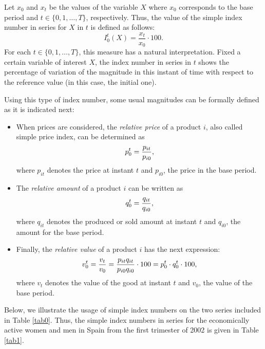 Let $x_0$ and $x_t$ be the values of the variable $X$ where $x_0$ corresponds to the base period and  $t\in \{0,1,\dots,T\}$,  respectively.  Thus, the value of the simple index number in series for $X$ in $t$ is defined as follows:
\begin{equation}\label{niinserie}
I_0^t(X)=\frac{x_t}{x_0}\cdot 100.
\end{equation}
For each  $t\in \{0,1,\dots,T\}$, this measure has a natural interpretation. Fixed a certain variable of interest $X$, the index number in series in $t$ shows the percentage of variation of the magnitude in this instant of time with respect to the reference value (in this case, the initial one). 

Using this type of index number, some usual magnitudes can be formally defined as it is indicated next: 
\begin{itemize}
	\item When  prices are considered, the \emph{relative price} of a product $i$, also called simple price index, can be determined as\vspace*{-0.05 cm} $$p_0^t=\frac{p_{it}}{p_{i0}},\vspace*{-0.05 cm}$$where $p_{it}$ denotes the price at instant $t$ and $p_{i0}$, the price in the base period. 
	\item The \emph{relative amount} of a product $i$ can be written as \vspace*{-0.05 cm} $$q_0^t=\frac{q_{it}}{q_{i0}},\vspace*{-0.05 cm}$$ where $q_{it}$ denotes the produced or sold amount at instant $t$ and $q_{i0}$, the amount for the base period. 
	\item Finally, the \emph{relative value} of a product $i$ has the next expression:\vspace*{-0.05 cm}$$v_0^t=\frac{v_t}{v_0}=\frac{p_{it}q_{it}}{p_{i0}q_{i0}}\cdot 100= p_0^t\cdot q_0^t\cdot 100,\vspace*{-0.05 cm}$$ where $v_{t}$ denotes the value of the good at instant $t$ and $v_{0}$, the value of the base period. 
\end{itemize}




Below, we illustrate the usage of simple index numbers on the two series included in Table \ref{tab0}. Thus, the simple index numbers in series for the economically active women and men in Spain from the first trimester of 2002 is given in Table \ref{tab1}. 

